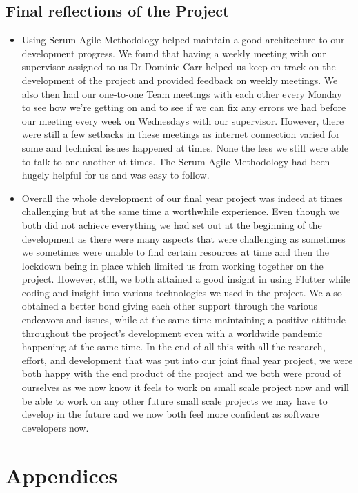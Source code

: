 \section{Final reflections of the Project}
\begin{itemize}
    \item Using Scrum Agile Methodology helped maintain a good architecture to our development progress. We found that having a weekly meeting with our supervisor assigned to us Dr.Dominic Carr helped us keep on track on the development of the project and provided feedback on weekly meetings. We also then had our one-to-one Team meetings with each other every Monday to see how we're getting on and to see if we can fix any errors we had before our meeting every week on Wednesdays with our supervisor. However, there were still a few setbacks in these meetings as internet connection varied for some and technical issues happened at times. None the less we still were able to talk to one another at times. The Scrum Agile Methodology had been hugely helpful for us and was easy to follow.
    \item Overall the whole development of our final year project was indeed at times challenging but at the same time a worthwhile experience. Even though we both did not achieve everything we had set out at the beginning of the development as there were many aspects that were challenging as sometimes we sometimes were unable to find certain resources at time and then the lockdown being in place which limited us from working together on the project. However, still, we both attained a good insight in using Flutter while coding and insight into various technologies we used in the project. We also obtained a better bond giving each other support through the various endeavors and issues, while at the same time maintaining a positive attitude throughout the project's development even with a worldwide pandemic happening at the same time. In the end of all this with all the research, effort, and development that was put into our joint final year project, we were both happy with the end product of the project and we both were proud of ourselves as we now know it feels to work on small scale project now and will be able to work on any other future small scale projects we may have to develop in the future and we now both feel more confident as software developers now.
\end{itemize}

\chapter{Appendices}
